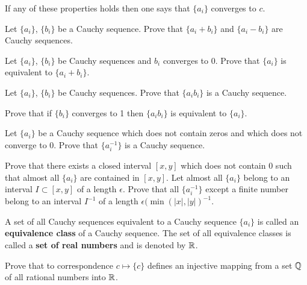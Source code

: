 \documentclass[12pt]{article}
\begin{document}
\begin{opredelenie} If any of these properties holds then one says
    that $\{ a_i\}$ converges to $c$.
\end{opredelenie}

\begin{zadacha}\label{sum} 
Let $\{ a_i\}$, $\{b_i\}$ be a Cauchy sequence. Prove that $\{ a_i +
b_i \}$ and $\{ a_i - b_i \}$ are Cauchy sequences.
\end{zadacha}

\begin{zadacha} Let $\{ a_i\}$, $\{b_i\}$ be Cauchy sequences and
  $b_i$ converges to 0. Prove that $\{ a_i\}$ is equivalent to $\{ a_i
  + b_i \}$.
\end{zadacha}

\begin{zadacha} Let $\{ a_i\}$, $\{b_i\}$ be Cauchy sequences. Prove
  that $\{ a_i b_i \}$ is a Cauchy sequence.
\end{zadacha}

\begin{zadacha} Prove that if $\{b_i\}$ converges to 1 then $\{
a_i b_i \}$ is equivalent to $\{ a_i\}$.
\end{zadacha}

\begin{zadacha}\label{div}
Let $\{ a_i\}$ be a Cauchy sequence which does not contain zeros and
which does not converge to $0$. Prove that $\{ a_i^{-1}\}$ is a Cauchy
sequence.
\end{zadacha}

\begin{ukazanie} Prove that there exists a closed interval $[x, y]$
  which does not contain $0$ such that almost all $\{ a_i\}$ are
  contained in $[x, y]$. Let almost all $\{ a_i\}$ belong to an
  interval $I\subset [x, y]$ of a length $\epsilon$. Prove that all
  $\{ a_i^{-1}\}$ except a finite number belong to an interval
  $I^{-1}$ of a length $\epsilon (\min(|x|, |y|)^{-1}$.
\end{ukazanie}

\begin{opredelenie}
A set of all Cauchy sequences equivalent to a Cauchy sequence
$\{a_i\}$ is called an {\bf equivalence class} of a Cauchy
sequence. The set of all equivalence classes is called a {\bf set of
  real numbers} and is denoted by ${\mathbb R}$.
\end{opredelenie}

\begin{zadacha}
Prove that to correspondence $c \mapsto \{c\}$ defines an injective
mapping from a set ${\mathbb Q}$ of all rational numbers into ${\mathbb R}$.
\end{zadacha}
\end{document}

